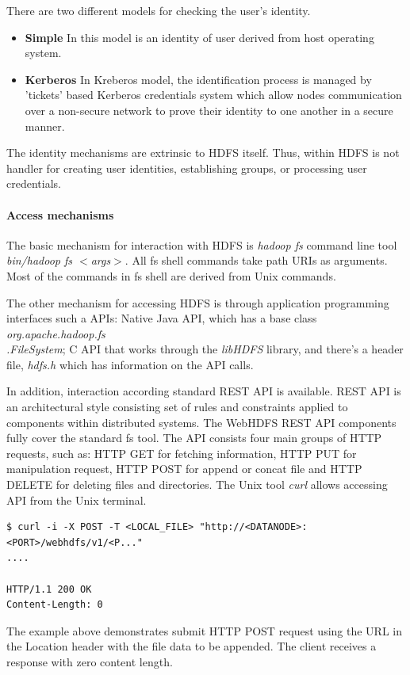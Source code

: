 \documentclass[a4paper,12pt,oneside]{report}
\begin{document}
	There are two different models for checking the user's identity.
	\begin{itemize}
		\item \textbf{Simple}  In this model is an identity of user derived from host
		operating system.
		\item \textbf{Kerberos} In Kreberos model, the identification process is managed
		by 'tickets' based  Kerberos credentials system which allow nodes communication
		over a non-secure network to prove their identity to one another in a secure
		manner.\cite{kerberos}
	\end{itemize}
	
	The identity mechanisms are  extrinsic to HDFS itself. Thus, within HDFS is not
	handler for creating user identities, establishing groups, or processing user
	credentials.
	
	\paragraph{Access mechanisms}
	The basic mechanism for interaction with HDFS is \textit{hadoop fs}  command
	line tool \textit{bin/hadoop fs $<$args$>$}. 
	All fs shell commands take path URIs as arguments. Most of the commands in fs
	shell are derived from Unix commands. 
	
	The other mechanism for accessing HDFS is through application programming
	interfaces such a APIs: Native Java API, which has a base class
	\textit{org.apache.hadoop.fs\\.FileSystem}; C API that works through the
	\textit{libHDFS} library, and there's a header file, \textit{hdfs.h} which has
	information on the API calls.
	
	In addition, interaction according standard REST API is available. REST API is
	an architectural style consisting set of rules and constraints applied to
	components within distributed systems. The WebHDFS REST API components fully
	cover the standard fs tool. The API consists four main groups of HTTP requests,
	such as: HTTP GET for fetching information, HTTP PUT for manipulation request,
	HTTP POST for append or concat file and HTTP DELETE for deleting files and
	directories.\cite{rest_api}
	The Unix tool \textit{curl}  allows accessing API from the Unix terminal. 
	\begin{footnotesize}
		\begin{lstlisting}[style=mybash]
$ curl -i -X POST -T <LOCAL_FILE> "http://<DATANODE>:<PORT>/webhdfs/v1/<P..."
....

HTTP/1.1 200 OK
Content-Length: 0
		\end{lstlisting}
	\end{footnotesize}
	The example above demonstrates submit  HTTP POST request using the URL in the
	Location header with the file data to be appended. The client receives a
	response with zero content length.
	
\end{document}
